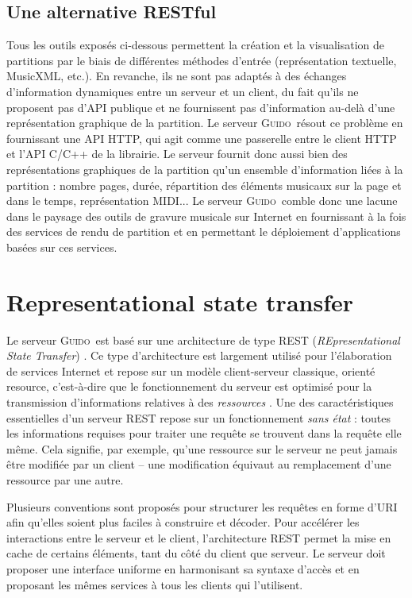 \documentclass{article}
\newcommand{\guido}		{\textsc{Guido}}
\begin{document}
\subsection{Une alternative RESTful}\label{subsection:restful}
Tous les outils exposés ci-dessous permettent la création et la visualisation de partitions par le biais de différentes méthodes d'entrée (représentation textuelle, MusicXML, etc.). En revanche, ils ne sont pas adaptés à des échanges d'information dynamiques entre un serveur et un client, du fait qu'ils ne proposent pas d'API publique et ne fournissent pas d'information au-delà d'une représentation graphique de la partition. Le serveur \guido\ résout ce problème en fournissant une API HTTP, qui agit comme une passerelle entre le client HTTP et l'API C/C++ de la librairie. Le serveur fournit donc aussi bien des représentations graphiques de la partition qu'un ensemble d'information liées à la partition : nombre pages, durée, répartition des éléments musicaux sur la page et dans le temps, représentation MIDI...
Le serveur \guido\ comble donc une lacune dans le paysage des outils de gravure musicale sur Internet en fournissant à la fois des services de rendu de partition et en permettant le déploiement d'applications basées sur ces services.

\section{Representational state transfer}\label{section:rest}

Le serveur \guido\ est basé sur une architecture de type REST (\emph{REpresentational State Transfer}) \cite{Fielding00}. Ce type d'architecture est largement utilisé pour l'élaboration de services Internet et repose sur un modèle client-serveur classique, \og{}orienté resource\fg{}, c'est-à-dire que le fonctionnement du serveur est optimisé pour la transmission d'informations relatives à des \emph{ressources} \cite{richardson2008restful}. Une des caractéristiques essentielles d'un serveur REST repose sur un fonctionnement \emph{sans état} : toutes les informations requises pour traiter une requête se trouvent dans la requête elle même. Cela signifie, par exemple, qu'une ressource sur le serveur ne peut jamais être modifiée par un client -- une modification équivaut au remplacement d'une ressource par une autre. 

Plusieurs conventions sont proposés pour structurer les requêtes en forme d'URI afin qu'elles soient plus faciles à construire et décoder. Pour accélérer les interactions entre le serveur et le client, l'architecture REST permet la mise en cache de certains éléments, tant du côté du client que serveur. Le serveur doit proposer une interface uniforme en harmonisant sa syntaxe d'accès et en proposant les mêmes services à tous les clients qui l'utilisent.
\end{document}
